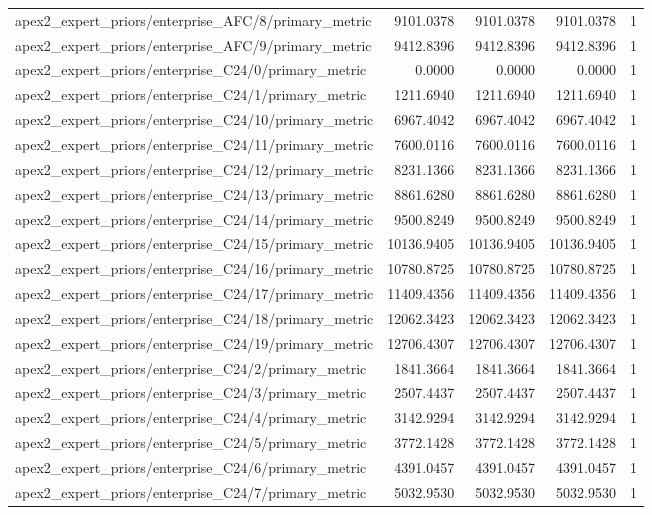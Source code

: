 \begin{table}[h]
\begin{tabular}{lrrrr}
apex2_expert_priors/enterprise_AFC/8/primary_metric & 9101.0378 & 9101.0378 & 9101.0378 & 1 \\
apex2_expert_priors/enterprise_AFC/9/primary_metric & 9412.8396 & 9412.8396 & 9412.8396 & 1 \\
apex2_expert_priors/enterprise_C24/0/primary_metric & 0.0000 & 0.0000 & 0.0000 & 1 \\
apex2_expert_priors/enterprise_C24/1/primary_metric & 1211.6940 & 1211.6940 & 1211.6940 & 1 \\
apex2_expert_priors/enterprise_C24/10/primary_metric & 6967.4042 & 6967.4042 & 6967.4042 & 1 \\
apex2_expert_priors/enterprise_C24/11/primary_metric & 7600.0116 & 7600.0116 & 7600.0116 & 1 \\
apex2_expert_priors/enterprise_C24/12/primary_metric & 8231.1366 & 8231.1366 & 8231.1366 & 1 \\
apex2_expert_priors/enterprise_C24/13/primary_metric & 8861.6280 & 8861.6280 & 8861.6280 & 1 \\
apex2_expert_priors/enterprise_C24/14/primary_metric & 9500.8249 & 9500.8249 & 9500.8249 & 1 \\
apex2_expert_priors/enterprise_C24/15/primary_metric & 10136.9405 & 10136.9405 & 10136.9405 & 1 \\
apex2_expert_priors/enterprise_C24/16/primary_metric & 10780.8725 & 10780.8725 & 10780.8725 & 1 \\
apex2_expert_priors/enterprise_C24/17/primary_metric & 11409.4356 & 11409.4356 & 11409.4356 & 1 \\
apex2_expert_priors/enterprise_C24/18/primary_metric & 12062.3423 & 12062.3423 & 12062.3423 & 1 \\
apex2_expert_priors/enterprise_C24/19/primary_metric & 12706.4307 & 12706.4307 & 12706.4307 & 1 \\
apex2_expert_priors/enterprise_C24/2/primary_metric & 1841.3664 & 1841.3664 & 1841.3664 & 1 \\
apex2_expert_priors/enterprise_C24/3/primary_metric & 2507.4437 & 2507.4437 & 2507.4437 & 1 \\
apex2_expert_priors/enterprise_C24/4/primary_metric & 3142.9294 & 3142.9294 & 3142.9294 & 1 \\
apex2_expert_priors/enterprise_C24/5/primary_metric & 3772.1428 & 3772.1428 & 3772.1428 & 1 \\
apex2_expert_priors/enterprise_C24/6/primary_metric & 4391.0457 & 4391.0457 & 4391.0457 & 1 \\
apex2_expert_priors/enterprise_C24/7/primary_metric & 5032.9530 & 5032.9530 & 5032.9530 & 1 \\

\end{tabular}
\end{table}

